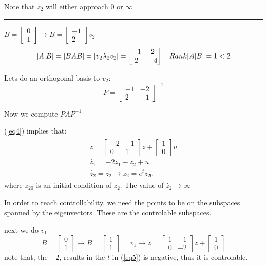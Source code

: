 \documentclass[a4paper]{article}
\begin{document}
Note that $ \dot{z_2} $ will either approach 0 or $ \infty $

\vspace{5pt}
\hrule
\vspace{5pt}
$ B = \begin{bmatrix}
0 \\
1
\end{bmatrix}  \rightarrow B = \begin{bmatrix}
-1 \\
2
\end{bmatrix} v_2 $ 
\[
	[A|B] = [B AB] = [v_2 \lambda_2v_2] = \begin{bmatrix}
	-1 & 2 \\
	2 & -4
\end{bmatrix} \hspace{10 pt} Rank[A|B] = 1 < 2
\] 

Lets do an orthogonal basis to $ v_2 $:
\begin{equation}\label{eq4}
P = \begin{bmatrix}
-1 & -2 \\
2 & -1
\end{bmatrix}^{-1} 
\end{equation} 
\vspace{5pt}

Now we compute $ P A P^{-1} $

(\ref{eq4}) implies that:
\begin{equation} \label{eq5}
\begin{split}
\begin{gathered}
\dot{z} = \begin{bmatrix}
-2 & -1 \\
0 & 1
\end{bmatrix}z + \begin{bmatrix}
1 \\
0
\end{bmatrix} u \\
\dot{z_1} =-2 z_1-z_2 + u \\
\dot{z_2} = z_2 \rightarrow z_2 = e^{t}z_{20}
\end{gathered}
\end{split}
\end{equation}
where $ z_{20} $ is an initial condition of $ z_2 $. The value of $ \dot{z_2} \rightarrow \infty $ 

In order to reach controllability, we need the points to be on the subspaces spanned by the eigenvectors. These are the controlable subspaces. 


next we do $ v_1 $
\[
B = \begin{bmatrix}
0 \\
1
\end{bmatrix} \rightarrow B = \begin{bmatrix}
1 \\
1
\end{bmatrix} = v_1 \rightarrow \dot{z} = \begin{bmatrix}
1 & -1 \\
0 & -2
\end{bmatrix}z + \begin{bmatrix}
1 \\
0
\end{bmatrix}
\] 
note that, the $ -2 $, results in the $ t $ in (\ref{eq5}) is negative, thus it is controlable.
\end{document}
